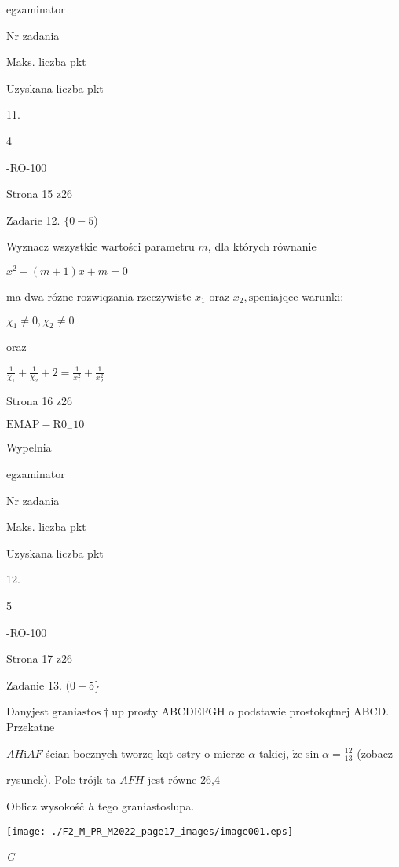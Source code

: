 \documentclass[a4paper,12pt]{article}
\begin{document}
egzaminator

Nr zadania

Maks. liczba pkt

Uzyskana liczba pkt

11.

4

-RO-100

Strona 15 z26





Zadarie 12. $\{0-5$)

Wyznacz wszystkie wartości parametru $m$, dla których równanie

$x^{2}-(m+1)x+m=0$

ma dwa rózne rozwiqzania rzeczywiste $x_{1}$ oraz $x_{2}, \mathrm{s}\mathrm{p}\mathrm{e}$niajqce warunki:

$\chi_{1}\neq 0, \chi_{2}\neq 0$

oraz

$\displaystyle \frac{1}{\chi_{1}}+\frac{1}{\chi_{2}}+2=\frac{1}{x_{1}^{2}}+\frac{1}{x_{2}^{2}}$

Strona 16 z26

$\mathrm{E}\mathrm{M}\mathrm{A}\mathrm{P}-\mathrm{R}0_{-}10$





Wypelnia

egzaminator

Nr zadania

Maks. liczba pkt

Uzyskana liczba pkt

12.

5

-RO-100

Strona 17 z26





Zadanie 13. $(0-5$\}

Danyjest $\mathrm{g}\mathrm{r}\mathrm{a}\mathrm{n}\mathrm{i}\mathrm{a}\mathrm{s}\mathrm{t}\mathrm{o}\mathrm{s}\dagger \mathrm{u}\mathrm{p}$ prosty ABCDEFGH o podstawie prostokqtnej ABCD. Przekatne

$AH \mathrm{i} AF$ ścian bocznych tworzq kqt ostry o mierze $\alpha$ takiej, $\dot{\mathrm{z}}\mathrm{e} \displaystyle \sin\alpha=\frac{12}{13}$ (zobacz

rysunek). Pole trójk ta $AFH$ jest równe 26,4

Oblicz wysokośč $h$ tego graniastoslupa.
\begin{center}
\texttt{[image: ./F2\_M\_PR\_M2022\_page17\_images/image001.eps]}
\end{center}
{\it G}
\end{document}
